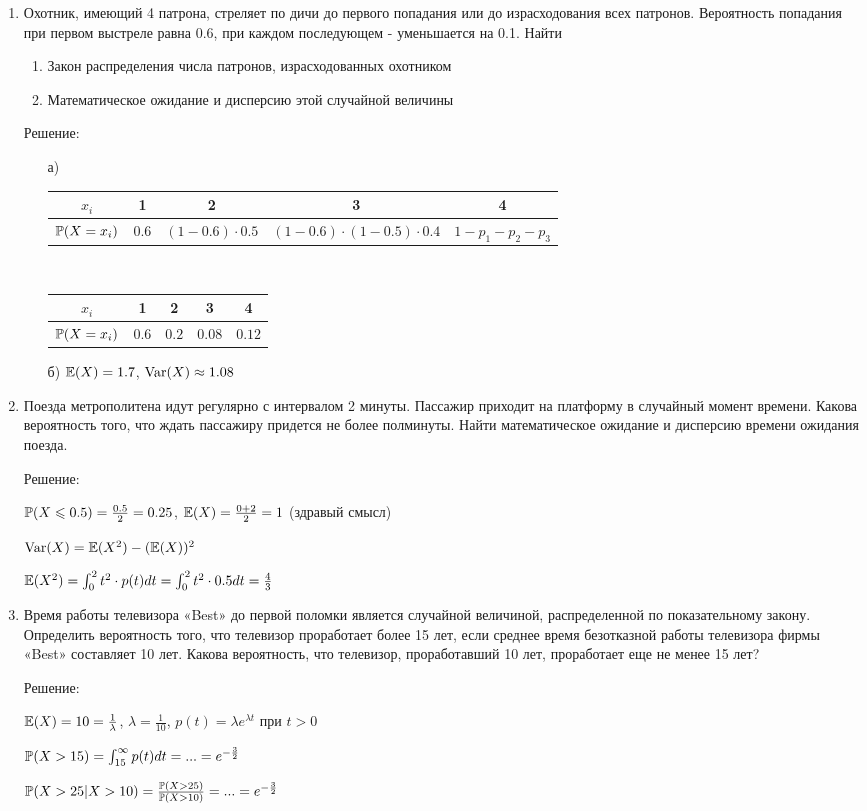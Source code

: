 \documentclass[12pt, a4paper]{article}\usepackage[]{graphicx}\usepackage[]{color}
\begin{document}
\begin{enumerate}
\item Охотник, имеющий 4 патрона, стреляет по дичи до первого
попадания или до израсходования всех патронов. Вероятность
попадания при первом выстреле равна 0.6, при каждом последующем -
уменьшается на 0.1. Найти
\begin{enumerate}
\item Закон распределения числа патронов, израсходованных охотником
\item Математическое ожидание и дисперсию этой случайной величины
\end{enumerate}
Решение:
\begin{enumerate}
\item[а)]
\begin{tabular}{|c|c|c|c|c|}
  \hline
  $x_{i}$ & 1 & 2 & 3 & 4 \\
  \hline
  $\P(X=x_{i})$ & $0.6$& $(1-0.6)\cdot 0.5$ & $(1-0.6)\cdot(1-0.5)\cdot 0.4$ & $1-p_{1}-p_{2}-p_{3}$ \\
  \hline
\end{tabular} \\
\begin{tabular}{|c|c|c|c|c|}
  \hline
  $x_{i}$ & 1 & 2 & 3 & 4 \\
  \hline
  $\P(X=x_{i})$ & $0.6$& $0.2$ & $0.08$ & $0.12$ \\
  \hline
\end{tabular}
\item[б)] $\E(X)=1.7$, $\Var(X)\approx 1.08$
\end{enumerate}
\item Поезда метрополитена идут регулярно с интервалом 2 минуты.
Пассажир приходит на платформу в случайный момент времени. Какова
вероятность того, что ждать пассажиру придется не более полминуты.
Найти математическое ожидание и дисперсию времени ожидания поезда.

Решение:

$\P(X\le 0.5)=\frac{0.5}{2}=0.25$, $\E(X)=\frac{0+2}{2}=1$ (здравый
смысл)

$\Var(X)=\E(X^{2})-(\E(X))^{2}$

$\E(X^{2})=\int_{0}^{2}t^{2}\cdot p(t)dt=\int_{0}^{2}t^{2}\cdot 0.5dt=\frac{4}{3}$

\item Время работы телевизора «Best» до первой поломки является
случайной величиной, распределенной по показательному закону.
Определить вероятность того, что телевизор проработает более 15
лет, если среднее время безотказной работы телевизора фирмы «Best»
составляет 10 лет. Какова вероятность, что телевизор,
проработавший 10 лет, проработает еще не менее 15 лет?

Решение:

$\E(X)=10=\frac{1}{\lambda}$, $\lambda=\frac{1}{10}$, $p(t)=\lambda e^{\lambda t}$ при $t>0$

$\P(X>15)=\int_{15}^{\infty}p(t)dt=...=e^{-\frac{3}{2}}$

$\P(X>25|X>10)=\frac{\P(X>25)}{\P(X>10)}=...=e^{-\frac{3}{2}}$
\end{enumerate}
\end{document}

